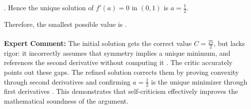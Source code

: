 \begin{examplebox}
. Hence the unique solution of \( f'(a) = 0 \) in \( (0,1) \) is \( a = \frac{1}{2} \).

Therefore, the smallest possible value is  .
\\\\
\textbf{Expert Comment:}
The initial solution gets the correct value $C = \frac{25}{2}$, but lacks rigor: it incorrectly assumes that symmetry implies a unique minimum, and references the second derivative without computing it \wronghl. The critic accurately points out these gaps. The refined solution corrects them by proving convexity through second derivatives and confirming $a = \frac{1}{2}$ is the unique minimizer through first derivatives \correcthl. This demonstrates that self-criticism effectively improves the mathematical soundness of the argument.

\end{examplebox}
